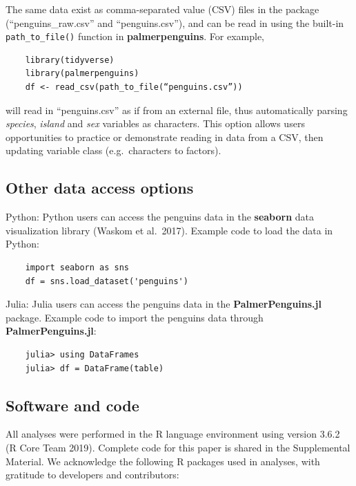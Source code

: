 The same data exist as comma-separated value (CSV) files in the package
(``penguins\_raw.csv'' and ``penguins.csv''), and can be read in using
the built-in \texttt{path\_to\_file()} function in
\textbf{palmerpenguins}. For example,

\begin{verbatim}
    library(tidyverse)
    library(palmerpenguins)
    df <- read_csv(path_to_file(“penguins.csv”))
\end{verbatim}

will read in ``penguins.csv'' as if from an external file, thus
automatically parsing \emph{species}, \emph{island} and \emph{sex}
variables as characters. This option allows users opportunities to
practice or demonstrate reading in data from a CSV, then updating
variable class (e.g.~characters to factors).

\hypertarget{other-data-access-options}{%
\subsection{Other data access options}\label{other-data-access-options}}

Python: Python users can access the penguins data in the
\textbf{seaborn} data visualization library (Waskom et al.~2017).
Example code to load the data in Python:

\begin{verbatim}
    import seaborn as sns
    df = sns.load_dataset('penguins') 
\end{verbatim}

Julia: Julia users can access the penguins data in the
\textbf{PalmerPenguins.jl} package. Example code to import the penguins
data through \textbf{PalmerPenguins.jl}:

\begin{verbatim}
    julia> using DataFrames
    julia> df = DataFrame(table)
\end{verbatim}

\hypertarget{software-and-code}{%
\subsection{Software and code}\label{software-and-code}}

All analyses were performed in the R language environment using version
3.6.2 (R Core Team 2019). Complete code for this paper is shared in the
Supplemental Material. We acknowledge the following R packages used in
analyses, with gratitude to developers and contributors:

